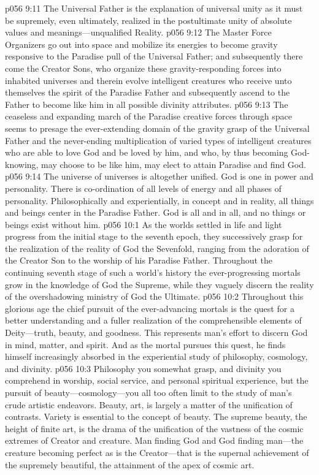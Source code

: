 \vs p056 9:11 The Universal Father is the explanation of universal unity as it must be supremely, even ultimately, realized in the postultimate unity of absolute values and meanings---unqualified Reality.
\vs p056 9:12 The Master Force Organizers go out into space and mobilize its energies to become gravity responsive to the Paradise pull of the Universal Father; and subsequently there come the Creator Sons, who organize these gravity\hyp{}responding forces into inhabited universes and therein evolve intelligent creatures who receive unto themselves the spirit of the Paradise Father and subsequently ascend to the Father to become like him in all possible divinity attributes.
\vs p056 9:13 The ceaseless and expanding march of the Paradise creative forces through space seems to presage the ever\hyp{}extending domain of the gravity grasp of the Universal Father and the never\hyp{}ending multiplication of varied types of intelligent creatures who are able to love God and be loved by him, and who, by thus becoming God\hyp{}knowing, may choose to be like him, may elect to attain Paradise and find God.
\vs p056 9:14 The universe of universes is altogether unified. God is one in power and personality. There is co\hyp{}ordination of all levels of energy and all phases of personality. Philosophically and experientially, in concept and in reality, all things and beings center in the Paradise Father. God is all and in all, and no things or beings exist without him.
\vs p056 10:1 As the worlds settled in life and light progress from the initial stage to the seventh epoch, they successively grasp for the realization of the reality of God the Sevenfold, ranging from the adoration of the Creator Son to the worship of his Paradise Father. Throughout the continuing seventh stage of such a world’s history the ever\hyp{}progressing mortals grow in the knowledge of God the Supreme, while they vaguely discern the reality of the overshadowing ministry of God the Ultimate.
\vs p056 10:2 Throughout this glorious age the chief pursuit of the ever\hyp{}advancing mortals is the quest for a better understanding and a fuller realization of the comprehensible elements of Deity---truth, beauty, and goodness. This represents man’s effort to discern God in mind, matter, and spirit. And as the mortal pursues this quest, he finds himself increasingly absorbed in the experiential study of philosophy, cosmology, and divinity.
\pc \vs p056 10:3 Philosophy you somewhat grasp, and divinity you comprehend in worship, social service, and personal spiritual experience, but the pursuit of beauty---cosmology---you all too often limit to the study of man’s crude artistic endeavors. Beauty, art, is largely a matter of the unification of contrasts. Variety is essential to the concept of beauty. The supreme beauty, the height of finite art, is the drama of the unification of the vastness of the cosmic extremes of Creator and creature. Man finding God and God finding man---the creature becoming perfect as is the Creator---that is the supernal achievement of the supremely beautiful, the attainment of the apex of cosmic art.
